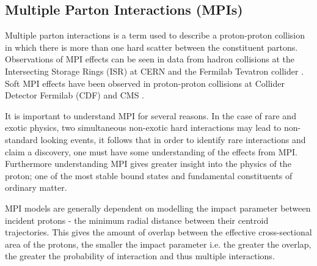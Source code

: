 \subsection{Multiple Parton Interactions (MPIs)}

Multiple parton interactions is a term used to describe a proton-proton collision in which there is more than one hard scatter between the constituent partons. Observations of MPI effects can be seen in data from hadron collisions at the Intersecting Storage Rings (ISR) at CERN \cite{Akesson:1986iv} and the Fermilab Tevatron collider \cite{Abe:1997bp} \cite{Drees:1996rw} \cite{Abazov:2009gc}. Soft MPI effects have been observed in proton-proton collisions at Collider Detector Fermilab (CDF) \cite{Acosta:2004wqa} \cite{Aaltonen:2010rm} and CMS \cite{Khachatryan:2010pv}.


It is important to understand MPI for several reasons. In the case of rare and exotic physics, two simultaneous non-exotic hard interactions may lead to non-standard looking events, it follows that in order to identify rare interactions and claim a discovery, one must have some understanding of the effects from MPI. Furthermore understanding MPI gives greater insight into the physics of the proton; one of the most stable bound states and fundamental constituents of ordinary matter.

MPI models are generally dependent on modelling the impact parameter between incident protons - the minimum radial distance between their centroid trajectories. This gives the amount of overlap between the effective cross-sectional area of the protons, the smaller the impact parameter i.e. the greater the overlap, the greater the probability of interaction and thus multiple interactions. 

